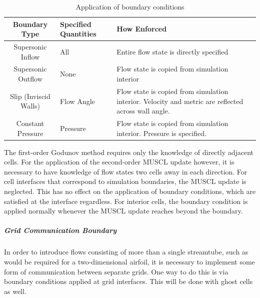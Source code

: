 \documentclass[12pt,letterpaper]{article}
\begin{document}
\begin{centering}
\begin{table}
\label{tab:boundary_conditions}
\caption{Application of boundary conditions}
\begin{tabular}{|c|p{.95in}|p{2.75in}|}
\hline
{\bf Boundary Type} & {\bf Specified Quantities} & {\bf How Enforced }\\
\hline
Supersonic Inflow  & All  & Entire flow state is directly specified \\
\hline
Supersonic Outflow & None      & Flow state is copied from simulation interior\\
\hline
Slip (Inviscid Walls)        & Flow Angle  & Flow state is copied from simulation interior. Velocity and metric are reflected across wall angle.\\
\hline
Constant Pressure  & Pressure    & Flow state is copied from simulation interior. Pressure is specified.\\
\hline
\end{tabular}
\end{table}
\end{centering}

The first-order Godunov method requires only the knowledge of directly adjacent cells. For the application of the second-order MUSCL update however, it is necessary to have knowledge of flow states two cells away in each direction. For cell interfaces that correspond to simulation boundaries, the MUSCL update is neglected. This has no effect on the application of boundary conditions, which are satisfied at the interface regardless. For interior cells, the boundary condition is applied normally whenever the MUSCL update reaches beyond the boundary.

\subparagraph{Grid Communication Boundary}
In order to introduce flows consisting of more than a single
streamtube, such as would be required for a two-dimensional airfoil,
it is necessary to implement some form of communication between
separate grids. One way to do this is via boundary conditions applied
at grid interfaces. This will be done with ghost cells as well.
\end{document}
